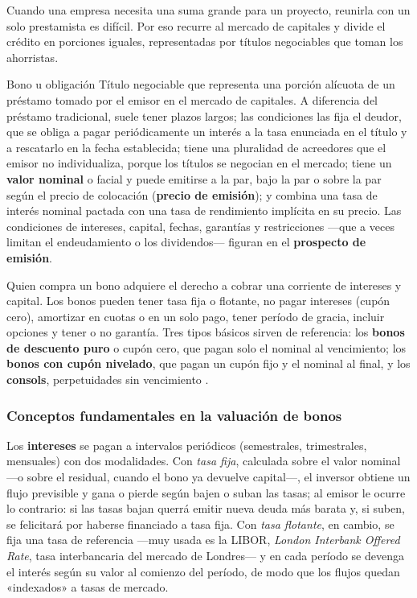 Cuando una empresa necesita una suma grande para un proyecto, reunirla con un solo prestamista es difícil. Por eso recurre al mercado de capitales y divide el crédito en porciones iguales, representadas por títulos negociables que toman los ahorristas.

\begin{definicion}{Bono u obligación}
Título negociable que representa una porción alícuota de un préstamo tomado por el emisor en el mercado de capitales. A diferencia del préstamo tradicional, suele tener plazos largos; las condiciones las fija el deudor, que se obliga a pagar periódicamente un interés a la tasa enunciada en el título y a rescatarlo en la fecha establecida; tiene una pluralidad de acreedores que el emisor no individualiza, porque los títulos se negocian en el mercado; tiene un \textbf{valor nominal} o facial y puede emitirse a la par, bajo la par o sobre la par según el precio de colocación (\textbf{precio de emisión}); y combina una tasa de interés nominal pactada con una tasa de rendimiento implícita en su precio. Las condiciones de intereses, capital, fechas, garantías y restricciones —que a veces limitan el endeudamiento o los dividendos— figuran en el \textbf{prospecto de emisión}.
\end{definicion}

Quien compra un bono adquiere el derecho a cobrar una corriente de intereses y capital. Los bonos pueden tener tasa fija o flotante, no pagar intereses (cupón cero), amortizar en cuotas o en un solo pago, tener período de gracia, incluir opciones y tener o no garantía. Tres tipos básicos sirven de referencia: los \textbf{bonos de descuento puro} o cupón cero, que pagan solo el nominal al vencimiento; los \textbf{bonos con cupón nivelado}, que pagan un cupón fijo y el nominal al final, y los \textbf{consols}, perpetuidades sin vencimiento .

\subsubsection{Conceptos fundamentales en la valuación de bonos}

Los \textbf{intereses} se pagan a intervalos periódicos (semestrales, trimestrales, mensuales) con dos modalidades. Con \emph{tasa fija}, calculada sobre el valor nominal —o sobre el residual, cuando el bono ya devuelve capital—, el inversor obtiene un flujo previsible y gana o pierde según bajen o suban las tasas; al emisor le ocurre lo contrario: si las tasas bajan querrá emitir nueva deuda más barata y, si suben, se felicitará por haberse financiado a tasa fija. Con \emph{tasa flotante}, en cambio, se fija una tasa de referencia —muy usada es la LIBOR, \emph{London Interbank Offered Rate}, tasa interbancaria del mercado de Londres— y en cada período se devenga el interés según su valor al comienzo del período, de modo que los flujos quedan «indexados» a tasas de mercado.


